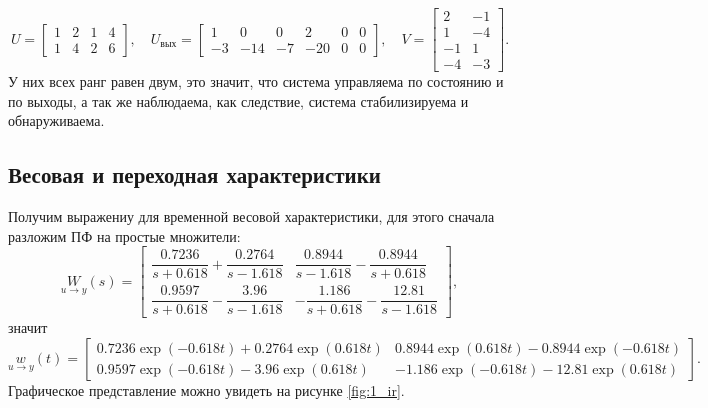 \begin{equation*}
    U=\begin{bmatrix}
        1 & 2 & 1 & 4 \\
        1 & 4 & 2 & 6
        \end{bmatrix},\quad
        U_\text{вых}=\begin{bmatrix}
        1 & 0 & 0 & 2 & 0 & 0 \\
        -3 & -14 & -7 & -20 & 0 & 0
        \end{bmatrix},\quad
        V=\begin{bmatrix}
        2 & -1 \\
        1 & -4 \\
        -1 & 1 \\
        -4 & -3
    \end{bmatrix}.
\end{equation*}
У них всех ранг равен двум, это значит, что система управляема по состоянию и по выходы, а
так же наблюдаема, как следствие, система стабилизируема и обнаруживаема.
\subsection{Весовая и переходная характеристики}
Получим выражениу для временной весовой характеристики, для этого сначала разложим ПФ
на простые множители:
\begin{equation*}
    \underset{u\rightarrow y}{W}(s)=\begin{bmatrix}
        \dfrac{0.7236}{s+0.618}+\dfrac{0.2764}{s-1.618} &
        \dfrac{0.8944}{s-1.618}-\dfrac{0.8944}{s+0.618} \\[2ex]
        \dfrac{0.9597}{s+0.618}-\dfrac{3.96}{s-1.618} &
        -\dfrac{1.186}{s+0.618}-\dfrac{12.81}{s-1.618}
    \end{bmatrix},
\end{equation*}
значит
\begin{equation*}
    \underset{u\rightarrow y}{w}(t)=\begin{bmatrix}
        0.7236\exp(-0.618t)+0.2764\exp(0.618t) &
        0.8944\exp(0.618t)-0.8944\exp(-0.618t) \\[2ex]
        0.9597\exp(-0.618t)-3.96\exp(0.618t) &
        -1.186\exp(-0.618t)-12.81\exp(0.618t)
    \end{bmatrix}.
\end{equation*}
Графическое представление можно увидеть на рисунке \ref{fig:1_ir}.

